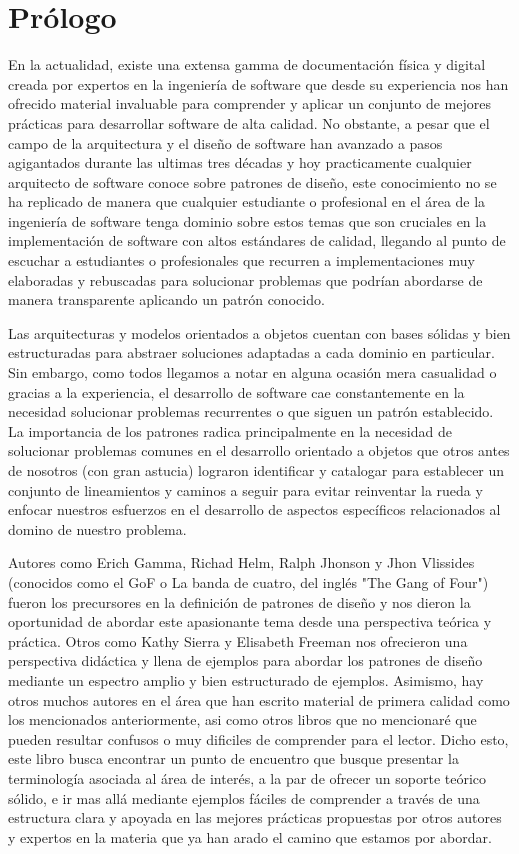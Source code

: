 \chapter*{Prólogo}

En la actualidad, existe una extensa gamma de documentación física y digital creada por expertos en la ingeniería de software que desde su experiencia nos han ofrecido material invaluable para comprender y aplicar un conjunto de mejores prácticas para desarrollar software de alta calidad. No obstante, a pesar que el campo de la arquitectura y el diseño de software han avanzado a pasos agigantados durante las ultimas tres décadas y hoy practicamente cualquier arquitecto de software conoce sobre patrones de diseño, este conocimiento no se ha replicado de manera que cualquier estudiante o profesional en el área de la ingeniería de software tenga dominio sobre estos temas que son cruciales en la implementación de software con altos estándares de calidad, llegando al punto de escuchar a estudiantes o profesionales que recurren a implementaciones muy elaboradas y rebuscadas para solucionar problemas que podrían abordarse de manera transparente aplicando un patrón conocido.

Las arquitecturas y modelos orientados a objetos cuentan con bases sólidas y bien estructuradas para abstraer soluciones adaptadas a cada dominio en particular. Sin embargo, como todos llegamos a notar en alguna ocasión mera casualidad o gracias a la experiencia, el desarrollo de software cae constantemente en la necesidad solucionar problemas recurrentes o que siguen un patrón establecido. La importancia de los patrones radica principalmente en la necesidad de solucionar problemas comunes en el desarrollo orientado a objetos que otros antes de nosotros (con gran astucia) lograron identificar y catalogar para establecer un conjunto de lineamientos y caminos a seguir para evitar reinventar la rueda y enfocar nuestros esfuerzos en el desarrollo de aspectos específicos relacionados al domino de nuestro problema.

Autores como Erich Gamma, Richad Helm, Ralph Jhonson y Jhon Vlissides (conocidos como el GoF o La banda de cuatro, del inglés "The Gang of Four") fueron los precursores en la definición de patrones de diseño y nos dieron la oportunidad de abordar este apasionante tema desde una perspectiva teórica y práctica. Otros como Kathy Sierra y Elisabeth Freeman nos ofrecieron una perspectiva didáctica y llena de ejemplos para abordar los patrones de diseño mediante un espectro amplio y bien estructurado de ejemplos. Asimismo, hay otros muchos autores en el área que han escrito material de primera calidad como los mencionados anteriormente, asi como otros libros que no mencionaré que pueden resultar confusos o muy dificiles de comprender para el lector. Dicho esto, este libro busca encontrar un punto de encuentro que busque presentar la terminología asociada al área de interés, a la par de ofrecer un soporte teórico sólido, e ir mas allá mediante ejemplos fáciles de comprender a través de una estructura clara y apoyada en las mejores prácticas propuestas por otros autores y expertos en la materia que ya han arado el camino que estamos por abordar.